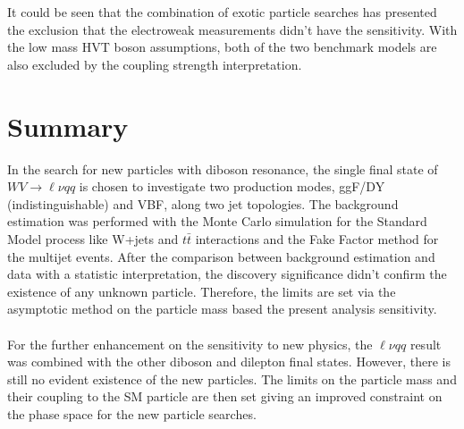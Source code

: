 \noindent
\\
\\It could be seen that the combination of exotic particle searches has presented the exclusion that the electroweak measurements didn't have the sensitivity. With the low mass HVT boson assumptions, both of the two benchmark models are also excluded by the coupling strength interpretation.
\section{Summary}
In the search for new particles with diboson resonance, the single final state of $WV\to\ell\nu qq$ is chosen to investigate two production modes, ggF/DY (indistinguishable) and VBF, along two jet topologies. The background estimation was performed with the Monte Carlo simulation for the Standard Model process like W+jets and $t\bar{t}$ interactions and the Fake Factor method for the multijet events. After the comparison between background estimation and data with a statistic interpretation, the discovery significance didn't confirm the existence of any unknown particle. Therefore, the limits are set via the asymptotic method on the particle mass based the present analysis sensitivity. 
\\
\\For the further enhancement on the sensitivity to new physics, the $\ell\nu qq$ result was combined with the other diboson and dilepton final states. However, there is still no evident existence of the new particles. The limits on the particle mass and their coupling to the SM particle are then set giving an improved constraint on the phase space for the new particle searches.  